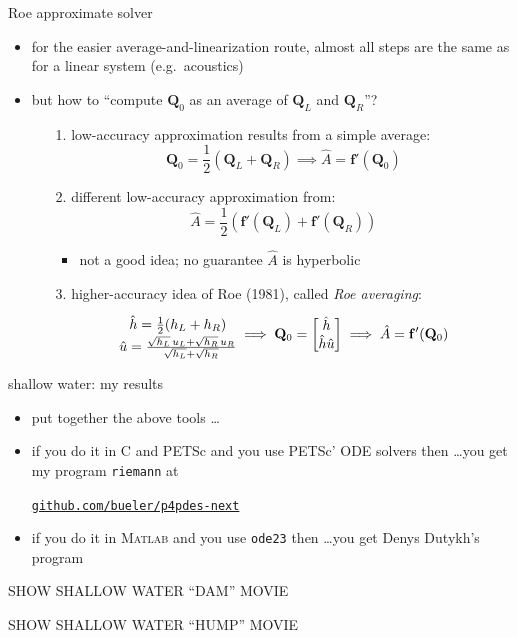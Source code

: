 \documentclass[10pt,hyperref,dvipsnames]{beamer}
\newcommand{\bbf}{\mathbf{f}}
\newcommand{\bQ}{\mathbf{Q}}
\newcommand{\Matlab}{\textsc{Matlab}\xspace}
\begin{document}
\begin{frame}{Roe approximate solver}

\begin{itemize}
\item for the easier average-and-linearization route, almost all steps are the same as for a linear system (e.g.~acoustics)
\item but how to ``compute $\bQ_0$ as an average of $\bQ_L$ and $\bQ_R$''?
    \begin{itemize}
    \item[1.] low-accuracy approximation results from a simple average:
        $$\bQ_0 = \frac{1}{2} \left(\bQ_L + \bQ_R\right) \implies \hat A = \bbf'(\bQ_0)$$
    \item[2.] different low-accuracy approximation from:
        $$\hat A = \frac{1}{2} \left(\bbf'(\bQ_L) + \bbf'(\bQ_R)\right)$$

        \begin{itemize}
        \item not a good idea; no guarantee $\hat A$ is hyperbolic
        \end{itemize}
    \item[3.] higher-accuracy idea of Roe (1981), called \emph{Roe averaging}:
        $$\begin{matrix} \hat h = \frac{1}{2} (h_L + h_R) {\Large\strut} \\
\hat u = \frac{\sqrt{h_L}\, u_L + \sqrt{h_R}\, u_R}{\sqrt{h_L} + \sqrt{h_R}}
\end{matrix}
\implies \bQ_0 = \begin{bmatrix} \hat h \\ \hat h \hat u \end{bmatrix} \implies \hat A = \bbf'(\bQ_0)$$
    \end{itemize}
\end{itemize}
\end{frame}


\begin{frame}{shallow water: my results}

\begin{itemize}
\item put together the above tools \dots
\item if you do it in C and PETSc and you use PETSc' ODE solvers then \dots you get my program \texttt{riemann} at
    \begin{center}
    \href{https://github.com/bueler/p4pdes-next}{\texttt{github.com/bueler/p4pdes-next}}
    \end{center}
\item if you do it in \Matlab and you use \texttt{ode23} then \dots you get Denys Dutykh's program
\end{itemize}

\vspace{10mm}
\begin{center}
\alert{SHOW SHALLOW WATER ``DAM'' MOVIE}

\bigskip
\alert{SHOW SHALLOW WATER ``HUMP'' MOVIE}
\end{center}
\end{frame}
\end{document}
